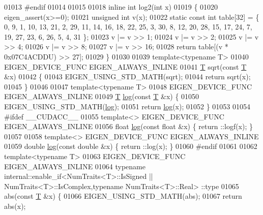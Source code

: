 \begin{DoxyCode}
01013 \textcolor{preprocessor}{#endif}
01014 
01015 
01018 \textcolor{keyword}{inline} \textcolor{keywordtype}{int} log2(\textcolor{keywordtype}{int} x)
01019 \{
01020   eigen\_assert(x>=0);
01021   \textcolor{keywordtype}{unsigned} \textcolor{keywordtype}{int} v(x);
01022   \textcolor{keyword}{static} \textcolor{keyword}{const} \textcolor{keywordtype}{int} table[32] = \{ 0, 9, 1, 10, 13, 21, 2, 29, 11, 14, 16, 18, 22, 25, 3, 30, 8, 12, 20, 28, 
      15, 17, 24, 7, 19, 27, 23, 6, 26, 5, 4, 31 \};
01023   v |= v >> 1;
01024   v |= v >> 2;
01025   v |= v >> 4;
01026   v |= v >> 8;
01027   v |= v >> 16;
01028   \textcolor{keywordflow}{return} table[(v * 0x07C4ACDDU) >> 27];
01029 \}
01030 
01039 \textcolor{keyword}{template}<\textcolor{keyword}{typename} T>
01040 EIGEN\_DEVICE\_FUNC EIGEN\_ALWAYS\_INLINE
01041 \hyperlink{group___sparse_core___module_class_eigen_1_1_triplet}{T} sqrt(\textcolor{keyword}{const} \hyperlink{group___sparse_core___module_class_eigen_1_1_triplet}{T} &x)
01042 \{
01043   EIGEN\_USING\_STD\_MATH(sqrt);
01044   \textcolor{keywordflow}{return} sqrt(x);
01045 \}
01046 
01047 \textcolor{keyword}{template}<\textcolor{keyword}{typename} T>
01048 EIGEN\_DEVICE\_FUNC EIGEN\_ALWAYS\_INLINE
01049 \hyperlink{group___sparse_core___module_class_eigen_1_1_triplet}{T} \hyperlink{structlog}{log}(\textcolor{keyword}{const} \hyperlink{group___sparse_core___module_class_eigen_1_1_triplet}{T} &x) \{
01050   EIGEN\_USING\_STD\_MATH(\hyperlink{structlog}{log});
01051   \textcolor{keywordflow}{return} \hyperlink{structlog}{log}(x);
01052 \}
01053 
01054 \textcolor{preprocessor}{#ifdef \_\_CUDACC\_\_}
01055 \textcolor{keyword}{template}<> EIGEN\_DEVICE\_FUNC EIGEN\_ALWAYS\_INLINE
01056 \textcolor{keywordtype}{float} \hyperlink{structlog}{log}(\textcolor{keyword}{const} \textcolor{keywordtype}{float} &x) \{ return ::logf(x); \}
01057 
01058 \textcolor{keyword}{template}<> EIGEN\_DEVICE\_FUNC EIGEN\_ALWAYS\_INLINE
01059 \textcolor{keywordtype}{double} \hyperlink{structlog}{log}(\textcolor{keyword}{const} \textcolor{keywordtype}{double} &x) \{ return ::log(x); \}
01060 \textcolor{preprocessor}{#endif}
01061 
01062 \textcolor{keyword}{template}<\textcolor{keyword}{typename} T>
01063 EIGEN\_DEVICE\_FUNC EIGEN\_ALWAYS\_INLINE
01064 \textcolor{keyword}{typename} internal::enable\_if<NumTraits<T>::IsSigned || NumTraits<T>::IsComplex,\textcolor{keyword}{typename} NumTraits<T>::Real>
      ::type
01065 abs(\textcolor{keyword}{const} \hyperlink{group___sparse_core___module_class_eigen_1_1_triplet}{T} &x) \{
01066   EIGEN\_USING\_STD\_MATH(abs);
01067   \textcolor{keywordflow}{return} abs(x);

\end{DoxyCode}
